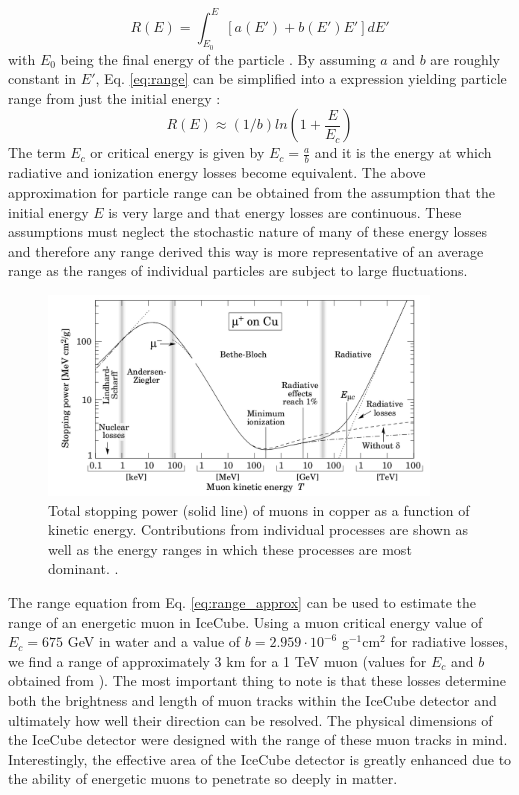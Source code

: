 \documentclass{gatech-thesis}
\begin{document}
\begin{equation}\label{eq:range}
R(E) = \int_{E_0}^{E}[a(E') + b(E')E']dE'
\end{equation}
with $E_0$ being the final energy of the particle \cite{2001ADNDT..78..183G}.
By assuming $a$ and $b$ are roughly constant in $E'$, Eq. \ref{eq:range} can be simplified into a expression yielding particle range from just the initial energy \cite{2001ADNDT..78..183G}:
\begin{equation}\label{eq:range_approx}
R(E) \approx (1/b)ln(1+\frac{E}{E_{c}})
\end{equation}
The term $E_{c}$ or critical energy is given by $E_{c}=\frac{a}{b}$ and it is the energy at which radiative and ionization energy losses become equivalent. The above approximation for particle range can be obtained from the assumption that the initial energy $E$ is very large and that energy losses are continuous. These assumptions must neglect the stochastic nature of many of these energy losses and therefore any range derived this way is more representative of an average range as the ranges of individual particles are subject to large fluctuations.

\begin{figure}[ht]
  \begin{center}
    \includegraphics[width=0.9\textwidth,keepaspectratio]{MuonStoppingPower.png}
  \end{center}
  \caption[Muon Stopping Power]{Total stopping power (solid line) of muons in copper as a function of kinetic energy. Contributions from individual processes are shown as well as the energy ranges in which these processes are most dominant. \cite{2001ADNDT..78..183G}.}
  \label{fig:MuonStoppingPower}
\end{figure}

The range equation from Eq. \ref{eq:range_approx} can be used to estimate the range of an energetic muon in IceCube. Using a muon critical energy value of $E_{c}=675$ GeV in water and a value of $b=2.959 \cdot 10^{-6}$ g$^{-1}$cm$^{2}$ for radiative losses, we find a range of approximately 3 km for a 1 TeV muon (values for $E_{c}$ and $b$ obtained from \cite{2001ADNDT..78..183G}). The most important thing to note is that these losses determine both the brightness and length of muon tracks within the IceCube detector and ultimately how well their direction can be resolved. The physical dimensions of the IceCube detector were designed with the range of these muon tracks in mind. Interestingly, the effective area of the IceCube detector is greatly enhanced due to the ability of energetic muons to penetrate so deeply in matter.
\end{document}
